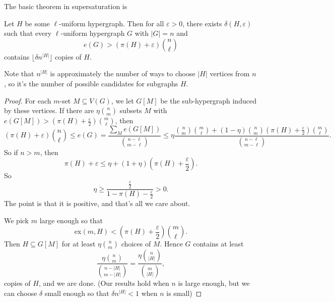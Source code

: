 \documentclass[a4paper]{article}
\renewcommand\ex{\mathrm{ex}}
\begin{document}
The basic theorem in supersaturation is
\begin{thm}
  Let $H$ be some $\ell$-uniform hypergraph. Then for all $\varepsilon > 0$, there exists $\delta(H, \varepsilon)$ such that every $\ell$-uniform hypergraph $G$ with $|G| = n$ and
  \[
    e(G) > (\pi(H) + \varepsilon) \binom{n}{\ell}
  \]
  contains $\lfloor \delta n^{|H|}\rfloor$ copies of $H$.
\end{thm}
Note that $n^{|H|}$ is approximately the number of ways to choose $|H|$ vertices from $n$, so it's the number of possible candidates for subgraphs $H$.

\begin{proof}
  For each $m$-set $M \subseteq V(G)$, we let $G[M]$ be the sub-hypergraph induced by these vertices. If there are $\eta \binom{n}{m}$ subsets $M$ with $e(G[M]) > \left(\pi(H) + \frac{\varepsilon}{2}\right) \binom{m}{\ell}$, then
  \[
    \left(\pi(H) + \varepsilon\right) \binom{n}{\ell} \leq e(G) = \frac{\sum_M e(G[M])}{\binom{n - \ell}{m - \ell}} \leq \eta \frac{\binom{n}{m} \binom{m}{\ell} + (1 - \eta) \binom{n}{m} \left(\pi(H) + \frac{\varepsilon}{2}\right) \binom{m}{\ell}}{\binom{n - \ell}{m - \ell}}.
  \]
  So if $n > m$, then
  \[
    \pi(H) + \varepsilon \leq \eta + (1 + \eta) \left(\pi(H) + \frac{\varepsilon}{2}\right).
  \]
  So
  \[
    \eta \geq \frac{\frac{\varepsilon}{2}}{1 - \pi(H) - \frac{\varepsilon}{2}} > 0.
  \]
  The point is that it is positive, and that's all we care about.

  We pick $m$ large enough so that
  \[
    \ex(m, H) < \left(\pi(H) + \frac{\varepsilon}{2}\right) \binom{m}{\ell}.
  \]
  Then $H \subseteq G[M]$ for at least $\eta \binom{n}{m}$ choices of $M$. Hence $G$ contains at least
  \[
    \frac{\eta\binom{n}{m}}{\binom{n - |H|}{m - |H|}} = \frac{\eta\binom{n}{|H|}}{\binom{m}{|H|}},
  \]
  copies of $H$, and we are done. (Our results hold when $n$ is large enough, but we can choose $\delta$ small enough so that $\delta n^{|H|} < 1$ when $n$ is small)
\end{proof}

\printindex
\end{document}
